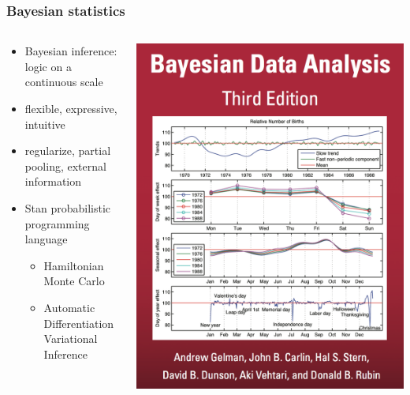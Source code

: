 \documentclass{beamer}
\begin{document}
\begin{frame}
  \frametitle{Bayesian statistics}

  \begin{columns}
    \begin{column}{0.5\textwidth}
      \begin{itemize}
        \item Bayesian inference: \\logic on a continuous scale
        \item flexible, expressive, intuitive
        \item regularize, partial pooling, external information
        \item Stan probabilistic programming language
          \begin{itemize}
            \item Hamiltonian Monte Carlo
            \item Automatic Differentiation Variational Inference
          \end{itemize}
      \end{itemize}
    \end{column}
    \begin{column}{0.5\textwidth}
      \begin{center}
        \includegraphics[width = \textwidth,height = 0.8\textheight,keepaspectratio = true]{figure/bda_cover}
      \end{center}
    \end{column}
  \end{columns}
\end{frame}
\end{document}
